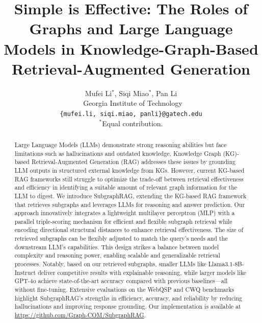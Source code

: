 \documentclass{article} %
\title{Simple is Effective: The Roles of Graphs and Large Language Models in Knowledge-Graph-Based Retrieval-Augmented Generation}
\author{Mufei Li$^{*}$, Siqi Miao$^{*}$, Pan Li \\\
Georgia Institute of Technology \\
\texttt{\{mufei.li, siqi.miao, panli\}@gatech.edu} \\
\footnotesize{$^{*}$Equal contribution.}}
\newcommand{\proj}{SubgraphRAG\xspace}
\begin{document}
\maketitle

\begin{abstract}

Large Language Models (LLMs) demonstrate strong reasoning abilities but face limitations such as hallucinations and outdated knowledge. Knowledge Graph (KG)-based Retrieval-Augmented Generation (RAG) addresses these issues by grounding LLM outputs in structured external knowledge from KGs. However, current KG-based RAG frameworks still struggle to optimize the trade-off between retrieval effectiveness and efficiency in identifying a suitable amount of relevant graph information for the LLM to digest. We introduce \proj, extending the KG-based RAG framework that retrieves subgraphs and leverages LLMs for reasoning and answer prediction. Our approach innovatively integrates a lightweight multilayer perceptron (MLP) with a parallel triple-scoring mechanism for efficient and flexible subgraph retrieval while encoding directional structural distances to enhance retrieval effectiveness. The size of retrieved subgraphs can be flexibly adjusted to match the query's needs and the downstream LLM's capabilities. This design strikes a balance between model complexity and reasoning power, enabling scalable and generalizable retrieval processes. Notably, based on our retrieved subgraphs, smaller LLMs like Llama3.1-8B-Instruct deliver competitive results with explainable reasoning, while larger models like GPT-4o achieve state-of-the-art accuracy compared with previous baselines—all without fine-tuning. Extensive evaluations on the WebQSP and CWQ benchmarks highlight \proj's strengths in efficiency, accuracy, and reliability by reducing hallucinations and improving response grounding. Our implementation is available at \href{https://github.com/Graph-COM/SubgraphRAG}{https://github.com/Graph-COM/SubgraphRAG}.
\end{abstract}













\end{document}
